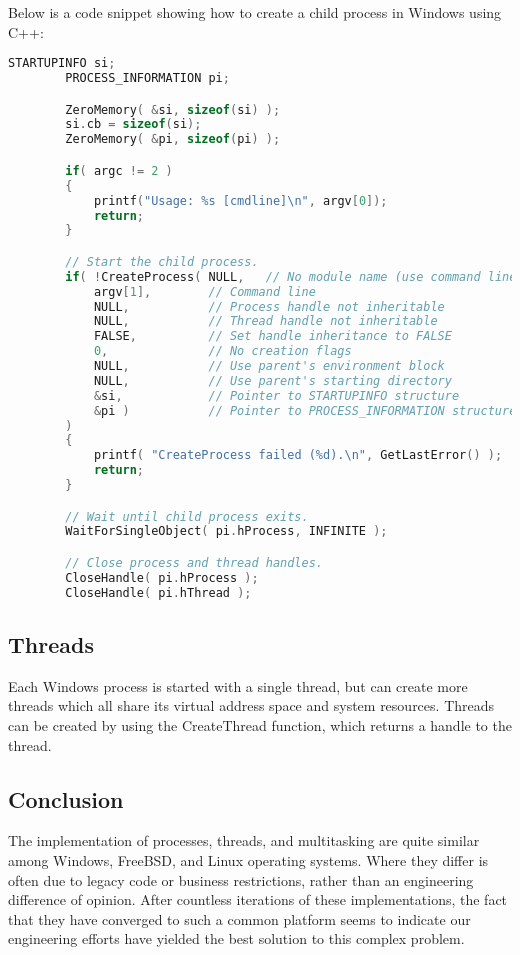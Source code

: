 \documentclass[letterpaper,draftclsnofoot,10pt,onecolumn,titlepage]{IEEEtran}\usepackage[margin=0.75in]{geometry}
\begin{document}
    Below is a code snippet showing how to create a child process in Windows using C++:
    \begin{lstlisting}[language=C++]
        STARTUPINFO si;
        PROCESS_INFORMATION pi;

        ZeroMemory( &si, sizeof(si) );
        si.cb = sizeof(si);
        ZeroMemory( &pi, sizeof(pi) );

        if( argc != 2 )
        {
            printf("Usage: %s [cmdline]\n", argv[0]);
            return;
        }

        // Start the child process.
        if( !CreateProcess( NULL,   // No module name (use command line)
            argv[1],        // Command line
            NULL,           // Process handle not inheritable
            NULL,           // Thread handle not inheritable
            FALSE,          // Set handle inheritance to FALSE
            0,              // No creation flags
            NULL,           // Use parent's environment block
            NULL,           // Use parent's starting directory
            &si,            // Pointer to STARTUPINFO structure
            &pi )           // Pointer to PROCESS_INFORMATION structure
        )
        {
            printf( "CreateProcess failed (%d).\n", GetLastError() );
            return;
        }

        // Wait until child process exits.
        WaitForSingleObject( pi.hProcess, INFINITE );

        // Close process and thread handles.
        CloseHandle( pi.hProcess );
        CloseHandle( pi.hThread );
    \end{lstlisting}

    \subsection{Threads}
    Each Windows process is started with a single thread, but can create more threads which all share its virtual
    address space and system resources. Threads can be created by using the CreateThread function, which returns a
    handle to the thread.
    
    
    \subsection{Conclusion}
    The implementation of processes, threads, and multitasking are quite similar among Windows, FreeBSD, and Linux 
    operating systems. Where they differ is often due to legacy code or business restrictions, rather than an 
    engineering difference of opinion. After countless iterations of these implementations, the fact that they 
    have converged to such a common platform seems to indicate our engineering efforts have yielded the best 
    solution to this complex problem.
\end{document}
